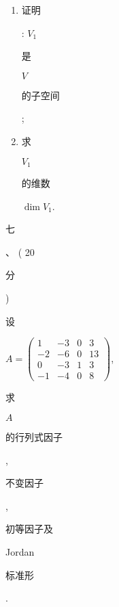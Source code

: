 \documentclass[10pt]{article}
\begin{document}
\begin{enumerate}
  \item \begin{CJK}{UTF8}{mj}证明\end{CJK}: $V_{1}$ \begin{CJK}{UTF8}{mj}是\end{CJK} $V$ \begin{CJK}{UTF8}{mj}的子空间\end{CJK};

  \item \begin{CJK}{UTF8}{mj}求\end{CJK} $V_{1}$ \begin{CJK}{UTF8}{mj}的维数\end{CJK} $\operatorname{dim} V_{1}$.

\end{enumerate}
\begin{CJK}{UTF8}{mj}七\end{CJK}、 ( 20 \begin{CJK}{UTF8}{mj}分\end{CJK}) \begin{CJK}{UTF8}{mj}设\end{CJK} $A=\left(\begin{array}{cccc}1 & -3 & 0 & 3 \\ -2 & -6 & 0 & 13 \\ 0 & -3 & 1 & 3 \\ -1 & -4 & 0 & 8\end{array}\right)$, \begin{CJK}{UTF8}{mj}求\end{CJK} $A$ \begin{CJK}{UTF8}{mj}的行列式因子\end{CJK}, \begin{CJK}{UTF8}{mj}不变因子\end{CJK}, \begin{CJK}{UTF8}{mj}初等因子及\end{CJK} Jordan \begin{CJK}{UTF8}{mj}标准形\end{CJK}.
\end{document}
